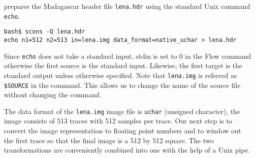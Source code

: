 
%
prepares the Madagascar header file \texttt{lena.hdr} using the
standard Unix command \texttt{echo}. 
%
\begin{verbatim}
bash$ scons -Q lena.hdr
echo n1=512 n2=513 in=lena.img data_format=native_uchar > lena.hdr
\end{verbatim}
%
Since \texttt{echo} does not take a standard input, stdin is set to 0
in the Flow command otherwise the first source is the standard input.
Likewise, the first target is the standard output unless otherwise
specified. 
Note that
\texttt{lena.img} is referred as \texttt{\$SOURCE} in the command. This
allows us to change the name of the source file without changing the command.

The data format of the \texttt{lena.img} image file is \texttt{uchar}
(unsigned character), the image consists of 513 traces with 512
samples per trace.  Our next step is to convert the image
representation to floating point numbers and to window out the first
trace so that the final image is a 512 by 512 square. The two
transformations are conveniently combined into one with the help of a Unix pipe.

